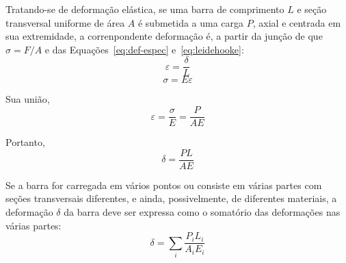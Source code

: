 Tratando-se de deformação elástica, se uma barra de comprimento $L$ e seção transversal uniforme de área $A$ é submetida a uma carga $P$, axial e centrada em sua extremidade, a correnpondente deformação é, a partir da junção de que $\sigma=F/A$ e das Equações~\eqref{eq:def-espec} e~\eqref{eq:leidehooke}:
$$\varepsilon=\frac{\delta}{L}$$
$$\sigma=E\varepsilon$$

Sua união,
$$\varepsilon=\frac{\sigma}{E}=\frac{P}{AE}$$

Portanto,
\begin{equation}
	\delta=\frac{PL}{AE}
\end{equation}

Se a barra for carregada em vários pontos ou consiste em várias partes com seções transversais diferentes, e ainda, possivelmente, de diferentes materiais, a deformação $\delta$ da barra deve ser expressa como o somatório das deformações nas várias partes:
\begin{equation}
	\delta=\sum_i\frac{P_iL_i}{A_iE_i}
\end{equation}